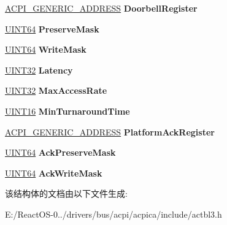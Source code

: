 \begin{DoxyCompactItemize}
\item 
\mbox{\label{structacpi__pcct__hw__reduced__type2_a90b2d42663864a6017c9551a36c6a401}} 
\hyperlink{structacpi__generic__address}{A\+C\+P\+I\+\_\+\+G\+E\+N\+E\+R\+I\+C\+\_\+\+A\+D\+D\+R\+E\+SS} {\bfseries Doorbell\+Register}
\item 
\mbox{\label{structacpi__pcct__hw__reduced__type2_ae4a6c739fc3fa1071f2bb6e0b2468dd4}} 
\hyperlink{_processor_bind_8h_a57be03562867144161c1bfee95ca8f7c}{U\+I\+N\+T64} {\bfseries Preserve\+Mask}
\item 
\mbox{\label{structacpi__pcct__hw__reduced__type2_ade9b985d8bb12c7c08f0fcf9ba2a5cbd}} 
\hyperlink{_processor_bind_8h_a57be03562867144161c1bfee95ca8f7c}{U\+I\+N\+T64} {\bfseries Write\+Mask}
\item 
\mbox{\label{structacpi__pcct__hw__reduced__type2_a77898290c8f3a10bb4c86baf99016852}} 
\hyperlink{_processor_bind_8h_ae1e6edbbc26d6fbc71a90190d0266018}{U\+I\+N\+T32} {\bfseries Latency}
\item 
\mbox{\label{structacpi__pcct__hw__reduced__type2_a74fb0d4a11ab62ced059935dcd717bb0}} 
\hyperlink{_processor_bind_8h_ae1e6edbbc26d6fbc71a90190d0266018}{U\+I\+N\+T32} {\bfseries Max\+Access\+Rate}
\item 
\mbox{\label{structacpi__pcct__hw__reduced__type2_a48d4fab1bfda7d0aceb532be2f8bc654}} 
\hyperlink{_processor_bind_8h_a09f1a1fb2293e33483cc8d44aefb1eb1}{U\+I\+N\+T16} {\bfseries Min\+Turnaround\+Time}
\item 
\mbox{\label{structacpi__pcct__hw__reduced__type2_aa75dd1fa693de81b7cbb727972868fc8}} 
\hyperlink{structacpi__generic__address}{A\+C\+P\+I\+\_\+\+G\+E\+N\+E\+R\+I\+C\+\_\+\+A\+D\+D\+R\+E\+SS} {\bfseries Platform\+Ack\+Register}
\item 
\mbox{\label{structacpi__pcct__hw__reduced__type2_a6eba50399a3312871d5645e1de64844f}} 
\hyperlink{_processor_bind_8h_a57be03562867144161c1bfee95ca8f7c}{U\+I\+N\+T64} {\bfseries Ack\+Preserve\+Mask}
\item 
\mbox{\label{structacpi__pcct__hw__reduced__type2_a916a17ab44ca62507ae360dd1ebaa9de}} 
\hyperlink{_processor_bind_8h_a57be03562867144161c1bfee95ca8f7c}{U\+I\+N\+T64} {\bfseries Ack\+Write\+Mask}
\end{DoxyCompactItemize}


该结构体的文档由以下文件生成\+:\begin{DoxyCompactItemize}
\item 
E\+:/\+React\+O\+S-\/0../drivers/bus/acpi/acpica/include/actbl3.\+h\end{DoxyCompactItemize}
